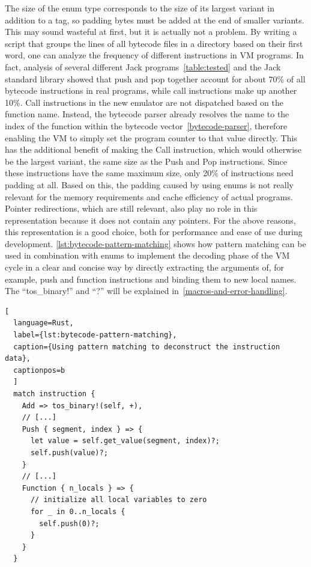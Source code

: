 \label{call-instruction}
The size of the enum type corresponds to the size of its largest variant in addition to a tag, so padding bytes must be added at the end of smaller variants.
This may sound wasteful at first, but it is actually not a problem.
By writing a script that groups the lines of all bytecode files in a directory based on their first word, one can analyze the frequency of different instructions in VM programs.
In fact, analysis of several different Jack programs~\ref{table:tested} and the Jack standard library showed that push and pop together account for about 70\% of all bytecode instructions in real programs, while call instructions make up another 10\%.
Call instructions in the new emulator are not dispatched based on the function name.
Instead, the bytecode parser already resolves the name to the index of the function within the bytecode vector~\ref{bytecode-parser}, therefore enabling the VM to simply set the program counter to that value directly.
This has the additional benefit of making the Call instruction, which would otherwise be the largest variant, the same size as the Push and Pop instructions.
Since these instructions have the same maximum size, only 20\% of instructions need padding at all.
Based on this, the padding caused by using enums is not really relevant for the memory requirements and cache efficiency of actual programs.
Pointer redirections, which are still relevant, also play no role in this representation because it does not contain any pointers.
For the above reasons, this representation is a good choice, both for performance and ease of use during development.
\cref{lst:bytecode-pattern-matching} shows how pattern matching can be used in combination with enums to implement the decoding phase of the VM cycle in a clear and concise way by directly extracting the arguments of, for example, push and function instructions and binding them to new local names.
The ``tos\_binary!'' and ``?'' will be explained in~\cref{macros-and-error-handling}.

\begin{lstlisting}[
  language=Rust,
  label={lst:bytecode-pattern-matching},
  caption={Using pattern matching to deconstruct the instruction data},
  captionpos=b
  ]
  match instruction {
    Add => tos_binary!(self, +),
    // [...]
    Push { segment, index } => {
      let value = self.get_value(segment, index)?;
      self.push(value)?;
    }
    // [...]
    Function { n_locals } => {
      // initialize all local variables to zero
      for _ in 0..n_locals {
        self.push(0)?;
      }
    }
  }
\end{lstlisting}

